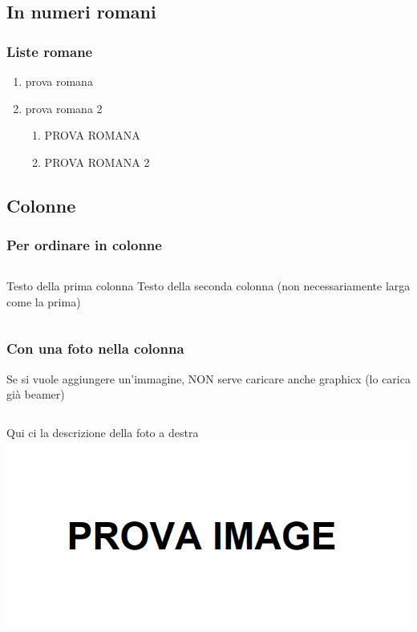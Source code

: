 \documentclass{beamer}[10]
\begin{document}
	\subsection{In numeri romani}
	\begin{frame}
		\frametitle{Liste romane}
		\begin{enumerate}[i]
			\item prova romana
			\item prova romana 2
			\begin{enumerate}[I]
				\item PROVA ROMANA
				\item PROVA ROMANA 2
			\end{enumerate}
		\end{enumerate}
	\end{frame}
	
	\subsection{Colonne}
	\begin{frame}
		\frametitle{Per ordinare in colonne}
		\begin{columns}
			Testo della prima colonna
			\column{0.2\textwidth}
			Testo della seconda colonna (non necessariamente larga come la prima)
		\end{columns}
	\end{frame}
	
	\begin{frame}
		\frametitle{Con una foto nella colonna}
		Se si vuole aggiungere un'immagine, NON serve caricare anche graphicx (lo carica già beamer)
		\begin{columns}
			\column{0.5\textwidth}
			Qui ci la descrizione della foto a destra
			\column{0.5\textwidth}
			\includegraphics[scale=0.1]{prova}
		\end{columns}
	\end{frame}
	
\end{document}
